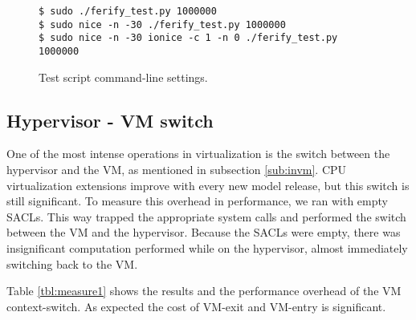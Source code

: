 \begin{figure}[ht]
	\centering
	\footnotesize{\selectfont 
		\begin{lstlisting}
$ sudo ./ferify_test.py 1000000
$ sudo nice -n -30 ./ferify_test.py 1000000
$ sudo nice -n -30 ionice -c 1 -n 0 ./ferify_test.py 1000000
	\end{lstlisting}}
	\caption{Test script command-line settings.}
	\label{fig:script}
\end{figure}


\subsection{Hypervisor - \ac{VM} switch}

\par One of the most intense operations in virtualization is the switch between the hypervisor and the \ac{VM}, as mentioned in subsection \ref{sub:invm}. \ac{CPU} virtualization extensions improve with every new model release, but this switch is still significant. To measure this overhead in performance, we ran  with empty \acp{SACL}. This way  trapped the appropriate system calls and performed the switch between the \ac{VM} and the hypervisor. Because the \acp{SACL} were empty, there was insignificant computation performed while on the hypervisor, almost immediately switching back to the \ac{VM}. 

\par  Table \ref{tbl:measure1} shows the results and the performance overhead of the \ac{VM} context-switch. As expected the cost of VM-exit and VM-entry is significant. 

